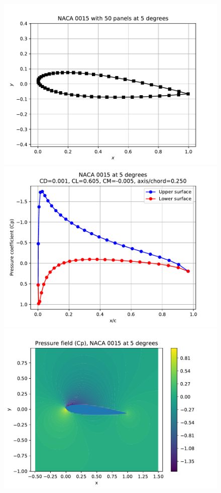 \documentclass[10pt]{article}
\begin{document}
\begin{figure}[htbp]
\begin{center}
\includegraphics[scale=.4]{plots/naca_panels.pdf}
\includegraphics[scale=.4]{plots/naca_cp_boundary.pdf}
\includegraphics[scale=.4]{plots/naca_cp_field.pdf}

\end{center}
\end{figure}
\end{document}
